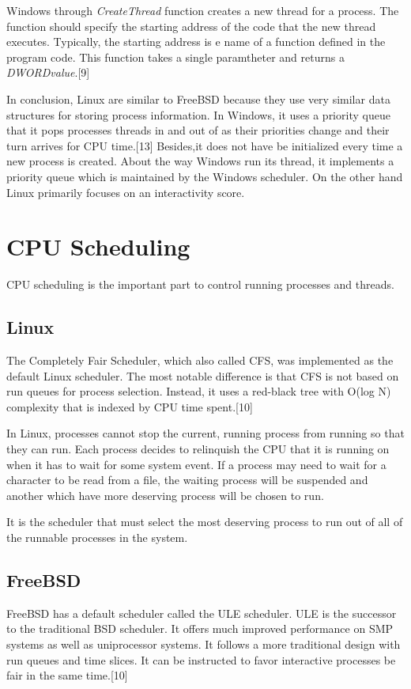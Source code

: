 \documentclass[onecolumn, draftclsnofoot,10pt, compsoc]{IEEEtran}
\begin{document}
Windows through \textit{CreateThread} function creates a new thread for a process. The function should specify the starting address of the code that the new thread executes. Typically, the starting address is e name of a function defined in the program code. This function takes a single paramtheter and returns a \textit{DWORDvalue}.[9] 

In conclusion, Linux are similar to FreeBSD because they use very similar data structures for storing process information. In Windows, it uses a priority queue that it pops processes threads in and out of as their priorities change and their turn arrives for CPU time.[13] Besides,it does not have be initialized every time a new process is created.
About the way Windows run its thread, it implements a priority queue which is maintained by the Windows scheduler. On the other hand Linux primarily focuses on an interactivity score.

\section{CPU Scheduling}
CPU scheduling is the important part to control running processes and threads.

\subsection{Linux}
The Completely Fair Scheduler, which also called CFS, was implemented as the default Linux scheduler. The most notable difference is that CFS is not based on run queues for process selection. Instead, it uses a red-black tree with O(log N) complexity that is indexed by CPU time spent.[10]

In Linux, processes cannot stop the current, running process from running so that they can run. Each process decides to relinquish the CPU that it is running on when it has to wait for some system event. If a process may need to wait for a character to be read from a file, the waiting process will be suspended and another which have more deserving process will be chosen to run.

It is the scheduler that must select the most deserving process to run out of all of the runnable processes in the system.

\subsection{FreeBSD}
FreeBSD has a default scheduler called the ULE scheduler. ULE is the successor to the traditional BSD scheduler. It offers much improved performance on SMP systems as well as uniprocessor systems. It follows a more traditional design with run queues and time slices. It can be instructed to favor interactive processes be fair in the same time.[10]
\end{document}
